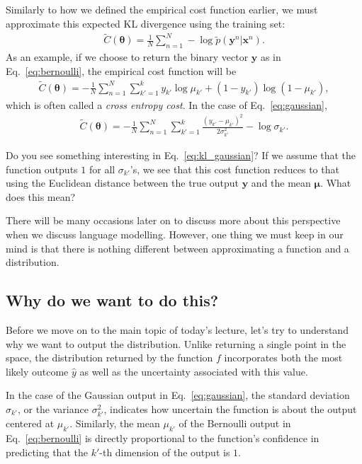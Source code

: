 \documentclass{report}
\newcommand{\vect}[1]{\mathbf{#1}}
\newcommand{\vects}[1]{\boldsymbol{#1}}
\newcommand{\vx}[0]{\vect{x}}
\newcommand{\vy}[0]{\vect{y}}
\newcommand{\TT}[0]{\vects{\theta}}
\newcommand{\vmu}[0]{\vects{\mu}}
\begin{document}
Similarly to how we defined the empirical cost function earlier, we must
approximate this expected KL divergence using the training set: 
\begin{align}
    \label{eq:kl_train}
    \tilde{C}(\TT) = \frac{1}{N} \sum_{n=1}^N -\log \tilde{p}(\vy^n|\vx^n).
\end{align}
As an example, if we choose to return the binary vector $\vy$ as in
Eq.~\eqref{eq:bernoulli}, the empirical cost function will be
\begin{align*}
    \tilde{C}(\TT) = -\frac{1}{N} \sum_{n=1}^N 
    \sum_{k'=1}^k y_{k'} \log \mu_{k'} + (1-y_{k'}) \log (1 - \mu_{k'}),
\end{align*}
which is often called a {\em cross entropy cost}. In the case of
Eq.~\eqref{eq:gaussian}, 
\begin{align}
    \label{eq:kl_gaussian}
    \tilde{C}(\TT) = -\frac{1}{N} \sum_{n=1}^N 
    \sum_{k'=1}^k \frac{(y_{k'} - \mu_{k'})^2}{2\sigma_{k'}^2} - \log
        \sigma_{k'}.
\end{align}

Do you see something interesting in Eq.~\eqref{eq:kl_gaussian}? If we assume
that the function outputs $1$ for all $\sigma_{k'}$'s, we see that this cost
function reduces to that using the Euclidean distance between the true output
$\vy$ and the mean $\vmu$. What does this mean?

There will be many occasions later on to discuss more about this perspective
when we discuss language modelling. However, one thing we must keep in our mind
is that there is nothing different between approximating a function and a
distribution.

\subsection{Why do we want to do this?}

Before we move on to the main topic of today's lecture, let's try to understand
why we want to output the distribution. Unlike returning a single point in the
space, the distribution returned by the function $f$ incorporates both the most
likely outcome $\hat{y}$ as well as the uncertainty associated with this value.

In the case of the Gaussian output in Eq.~\eqref{eq:gaussian}, the standard
deviation $\sigma_{k'}$, or the variance $\sigma_{k'}^2$, indicates how
uncertain the function is about the output centered at $\mu_{k'}$. Similarly,
the mean $\mu_{k'}$ of the Bernoulli output in Eq.~\eqref{eq:bernoulli} is
directly proportional to the function's confidence in predicting that the
$k'$-th dimension of the output is $1$.
\end{document}

